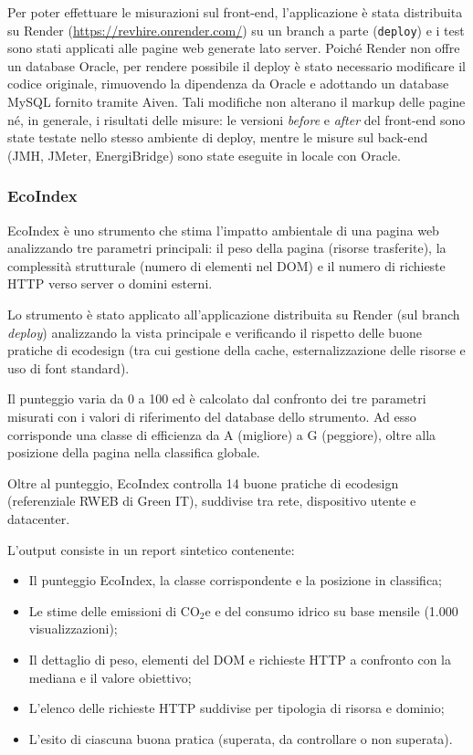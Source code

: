 \documentclass[12pt,a4paper]{article}
\begin{document}
    Per poter effettuare le misurazioni sul front-end, l'applicazione è stata distribuita
    su Render (\url{https://revhire.onrender.com/}) su un branch a parte (\texttt{deploy}) e i test sono stati applicati alle
    pagine web generate lato server. Poiché Render non offre un database Oracle, per
    rendere possibile il deploy è stato necessario modificare il codice originale,
    rimuovendo la dipendenza da Oracle e adottando un database MySQL fornito tramite
    Aiven. Tali modifiche non alterano il markup delle pagine né, in generale, i risultati delle misure: le versioni \emph{before} e \emph{after} del front-end sono
    state testate nello stesso ambiente di deploy, mentre le misure sul back-end (JMH, JMeter, EnergiBridge) sono state eseguite in locale con Oracle.

    \subsubsection{EcoIndex}
    EcoIndex è uno strumento che stima l'impatto ambientale di una pagina web analizzando tre parametri principali:
    il peso della pagina (risorse trasferite), la complessità strutturale (numero di elementi nel DOM) e
    il numero di richieste HTTP verso server o domini esterni.

    Lo strumento è stato applicato all'applicazione distribuita su Render (sul branch \textit{deploy}) analizzando la vista principale e verificando
    il rispetto delle buone pratiche di ecodesign (tra cui gestione della cache, esternalizzazione delle risorse e
    uso di font standard).

    Il punteggio varia da 0 a 100 ed è calcolato dal confronto dei tre parametri misurati con i valori di riferimento
    del database dello strumento. Ad esso corrisponde una classe di efficienza da A (migliore) a G (peggiore),
    oltre alla posizione della pagina nella classifica globale.

    Oltre al punteggio, EcoIndex controlla 14 buone pratiche di ecodesign (referenziale RWEB di Green IT),
    suddivise tra rete, dispositivo utente e datacenter.

    L'output consiste in un report sintetico contenente:
    \begin{itemize}
        \item Il punteggio EcoIndex, la classe corrispondente e la posizione in classifica;
        \item Le stime delle emissioni di CO$_2$e e del consumo idrico su base mensile (1.000 visualizzazioni);
        \item Il dettaglio di peso, elementi del DOM e richieste HTTP a confronto con la mediana e il valore obiettivo;
        \item L'elenco delle richieste HTTP suddivise per tipologia di risorsa e dominio;
        \item L'esito di ciascuna buona pratica (superata, da controllare o non superata).
    \end{itemize}
\end{document}
